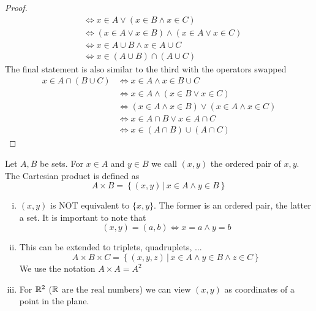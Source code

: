 \documentclass[../../script.tex]{subfiles}
\begin{document}
\begin{proof}
\begin{equation}
\begin{split}
			&\iff x \in A \vee (x \in B \wedge x \in C) \\
			&\iff (x \in A \vee x \in B) \wedge (x \in A \vee x \in C) \\
			&\iff x \in A \cup B \wedge x \in A \cup C \\
			&\iff x \in (A \cup B) \cap (A \cup C)
		\end{split}
	\end{equation}
	The final statement is also similar to the third with the operators swapped
	\begin{equation}
		\begin{split}
			x \in A \cap (B \cup C) &\iff x \in A \wedge x \in B \cup C \\
			&\iff x \in A \wedge (x \in B \vee x \in C) \\
			&\iff (x \in A \wedge x \in B) \vee (x \in A \wedge x \in C) \\
			&\iff x \in A \cap B \vee x \in A \cap C \\
			&\iff x \in (A \cap B) \cup (A \cap C)
		\end{split}
	\end{equation}
	
\end{proof}

\begin{defi}
	Let $A, B$ be sets. For $x \in A$ and $y \in B$ we call $(x, y)$ the ordered pair of $x, y$. The Cartesian product is defined as
	\[
		A \times B = \left\{(x, y) \,\vert\, x \in A \wedge y \in B\right\}
	\]
\end{defi}

\pagebreak
\begin{rem}\leavevmode
\begin{enumerate}[(i)]
	\item $(x, y)$ is NOT equivalent to $\{x, y\}$. The former is an ordered pair, the latter a set. It is important to note that
	\[
		(x, y) = (a, b) \iff x = a \wedge y = b
	\]
	\item This can be extended to triplets, quadruplets, ...
	\[
		A \times B \times C = \left\{(x, y, z) \,\vert\, x \in A \wedge y \in B \wedge z \in C \right\}
	\]
	We use the notation $A \times A = A^2$
	\item For $\mathbb{R}^2$ ($\mathbb{R}$ are the real numbers) we can view $(x, y)$ as coordinates of a point in the plane.
\end{enumerate}
\end{rem}
\end{document}
